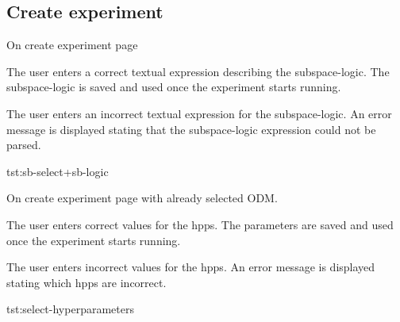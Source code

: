 \documentclass[11pt, english]{scrartcl}
\begin{document}
\subsection*{Create \gls{experiment}}


    {On create \gls{experiment} page}{
    

    \teststepnostate
    {The user enters a correct textual expression describing the \gls{subspace-logic}.}
    {The \gls{subspace-logic} is saved and used once the \gls{experiment} starts running.}

    \teststepnostate
    {The user enters an incorrect textual expression for the \gls{subspace-logic}.}
    {An error message is displayed stating that the \gls{subspace-logic} expression could not be parsed.}
    
}{tst:sb-select+sb-logic}


    {On create \gls{experiment} page with already selected \gls{ODM}.}{

    \teststepnostate
    {The user enters correct values for the \glspl{hpp}.}
    {The parameters are saved and used once the \gls{experiment} starts running.}
    
    \teststepnostate
    {The user enters incorrect values for the \glspl{hpp}.}
    {An error message is displayed stating which \glspl{hpp} are incorrect.}
    
}{tst:select-hyperparameters}
\end{document}
